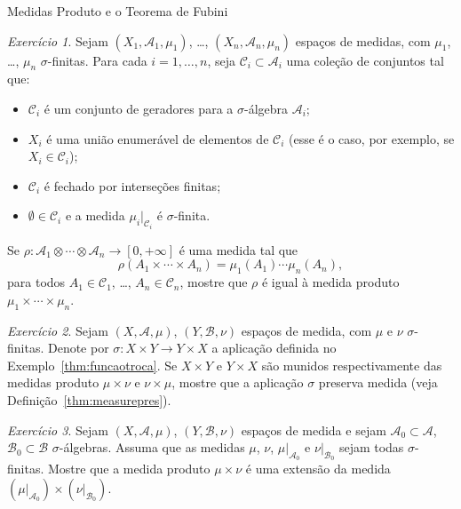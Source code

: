 \documentclass[oneside,final,11pt]{amsbook}
\theoremstyle{remark}\newtheorem{exercise}{Exercício}[chapter]
\theoremstyle{remark}\newtheorem{*exercise}[exercise]{\hbox to 0pt{\hskip 0pt minus 1fil*}Exercício}
\theoremstyle{definition}\newtheorem{exdefin}{Definição}[chapter]
\theoremstyle{plain}\newtheorem{teo}{Teorema}[section]
\theoremstyle{plain}\newtheorem{lem}[teo]{Lema}
\theoremstyle{plain}\newtheorem{prop}[teo]{Proposição}
\theoremstyle{plain}\newtheorem{cor}[teo]{Corolário}
\theoremstyle{definition}\newtheorem{defin}[teo]{Definição}
\theoremstyle{remark}\newtheorem{rem}[teo]{Observação}
\theoremstyle{definition}\newtheorem{notation}[teo]{Notação}
\theoremstyle{definition}\newtheorem{convention}[teo]{Convenção}
\theoremstyle{definition}\newtheorem{example}[teo]{Exemplo}
\numberwithin{section}{chapter}
\numberwithin{equation}{section}
\begin{document}
\begin{chapter}{Medidas Produto e o Teorema de Fubini}
\begin{exercise}\label{exe:muprodvarios}
Sejam $(X_1,\mathcal A_1,\mu_1)$, \dots, $(X_n,\mathcal A_n,\mu_n)$ espaços de medidas, com $\mu_1$, \dots, $\mu_n$
$\sigma$-finitas. Para cada $i=1,\ldots,n$, seja $\mathcal C_i\subset\mathcal A_i$ uma coleção de conjuntos tal que:
\begin{itemize}
\item $\mathcal C_i$ é um conjunto de geradores para a $\sigma$-álgebra $\mathcal A_i$;
\item $X_i$ é uma união enumerável de elementos de $\mathcal C_i$ (esse é o caso, por exemplo, se $X_i\in\mathcal C_i$);
\item $\mathcal C_i$ é fechado por interseções finitas;
\item $\emptyset\in\mathcal C_i$ e a medida $\mu_i\vert_{\mathcal C_i}$ é $\sigma$-finita.
\end{itemize}
Se $\rho:\mathcal A_1\otimes\cdots\otimes\mathcal A_n\to[0,+\infty]$ é uma medida tal que
\[\rho(A_1\times\cdots\times A_n)=\mu_1(A_1)\cdots\mu_n(A_n),\]
para todos $A_1\in\mathcal C_1$, \dots, $A_n\in\mathcal C_n$,
mostre que $\rho$ é igual à medida produto $\mu_1\times\cdots\times\mu_n$.
\end{exercise}

\begin{exercise}\label{exe:trocapresmed}
Sejam $(X,\mathcal A,\mu)$, $(Y,\mathcal B,\nu)$ espaços de medida, com $\mu$ e $\nu$ $\sigma$-finitas.
Denote por $\sigma:X\times Y\to Y\times X$ a aplicação definida no Exemplo~\ref{thm:funcaotroca}. Se $X\times Y$
e $Y\times X$ são munidos respectivamente das medidas produto $\mu\times\nu$ e $\nu\times\mu$, mostre
que a aplicação $\sigma$ preserva medida (veja Definição~\ref{thm:measurepres}).
\end{exercise}

\begin{exercise}\label{exe:extendprod}
Sejam $(X,\mathcal A,\mu)$, $(Y,\mathcal B,\nu)$ espaços de medida e sejam $\mathcal A_0\subset\mathcal A$,
$\mathcal B_0\subset\mathcal B$ $\sigma$-álgebras. Assuma que as medidas
$\mu$, $\nu$, $\mu\vert_{\mathcal A_0}$ e $\nu\vert_{\mathcal B_0}$ sejam todas
$\sigma$-finitas. Mostre que a medida produto $\mu\times\nu$ é uma extensão
da medida $(\mu\vert_{\mathcal A_0})\times(\nu\vert_{\mathcal B_0})$.
\end{exercise}

\end{chapter}
\end{document}
